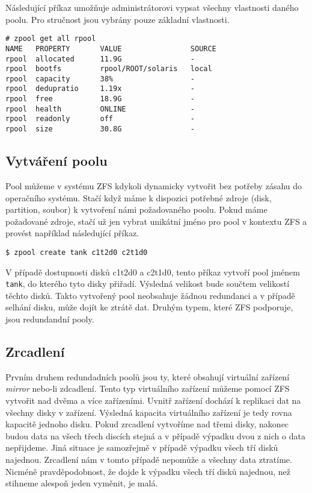 Následující příkaz umožňuje administrátorovi vypsat všechny vlastnosti daného poolu. Pro stručnost jsou vybrány pouze základní vlastnosti.
\begin{verbatim}
# zpool get all rpool
NAME   PROPERTY       VALUE                SOURCE
rpool  allocated      11.9G                -
rpool  bootfs         rpool/ROOT/solaris   local
rpool  capacity       38%                  -
rpool  dedupratio     1.19x                -
rpool  free           18.9G                -
rpool  health         ONLINE               -
rpool  readonly       off                  -
rpool  size           30.8G                -
\end{verbatim}

\subsection{Vytváření poolu}
Pool můžeme v systému ZFS kdykoli dynamicky vytvořit bez potřeby zásahu do operačního systému. Stačí když máme k dispozici potřebné zdroje (disk, partition, soubor) k vytvoření námi požadovaného poolu. Pokud máme požadované zdroje, stačí už jen vybrat unikátní jméno pro pool v kontextu ZFS a provést například následující příkaz.
\begin{verbatim}
$ zpool create tank c1t2d0 c2t1d0
\end{verbatim}
V případě dostupnosti disků c1t2d0 a c2t1d0, tento příkaz vytvoří pool jménem \verb|tank|, do kterého tyto disky přiřadí. Výsledná velikost bude součtem velikostí těchto disků. Takto vytvořený pool neobsahuje žádnou redundanci a v případě selhání disku, může dojít ke ztrátě dat. Druhým typem, které ZFS podporuje, jsou redundandní pooly.
\subsection{Zrcadlení}
Prvním druhem redundadních poolů jsou ty, které obsahují virtuální zařízení \emph{mirror} nebo-li zdcadlení. Tento typ virtuálního zařízení můžeme pomocí ZFS vytvořit nad dvěma a více zařízeními. Uvnitř zařízení dochází k replikaci dat na všechny disky v zařízení. Výsledná kapacita virtuálního zařízení je tedy rovna kapacitě jednoho disku. Pokud zrcadlení vytvoříme nad třemi disky, nakonec budou data na všech třech discích stejná a v případě výpadku dvou z nich o data nepřijdeme. Jiná situace je samozřejmě v případě výpadku všech tří disků najednou. Zrcadlení nám v tomto případě nepomůže a všechny data ztratíme. Nicméně pravděpodobnost, že dojde k výpadku všech tří disků najednou, než stihneme alespoň jeden vyměnit, je malá.

